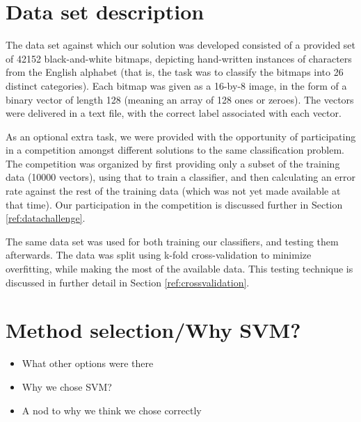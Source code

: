 \documentclass{netsec2012}
\begin{document}
\section{Data set description}

The data set against which our solution was developed consisted of a provided set of 42152
black-and-white bitmaps, depicting hand-written instances of characters from the English alphabet
(that is, the task was to classify the bitmaps into 26 distinct categories).  Each bitmap was given
as a 16-by-8 image, in the form of a binary vector of length 128 (meaning an array of 128 ones or
zeroes).  The vectors were delivered in a text file, with the correct label associated with each
vector.

As an optional extra task, we were provided with the opportunity of participating in a competition
amongst different solutions to the same classification problem.  The competition was organized by
first providing only a subset of the training data (10000 vectors), using that to train a
classifier, and then calculating an error rate against the rest of the training data (which was not
yet made available at that time).  Our participation in the competition is discussed further in
Section \ref{ref:datachallenge}.

The same data set was used for both training our classifiers, and testing them afterwards.  The data
was split using k-fold cross-validation to minimize overfitting, while making the most of the
available data.  This testing technique is discussed in further detail in Section
\ref{ref:crossvalidation}.

%
%
%

\section{Method selection/Why SVM?}

\begin{itemize}
\item What other options were there
\item Why we chose SVM?
\item A nod to why we think we chose correctly
\end{itemize}
\end{document}
